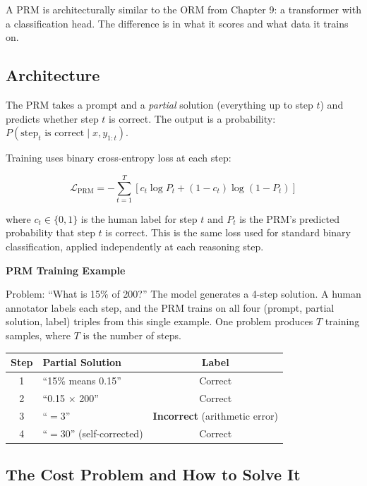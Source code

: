 \begin{chapterenv}
A PRM is architecturally similar to the ORM from Chapter 9: a transformer with a classification head. The difference is in what it scores and what data it trains on.

\subsection{Architecture}

The PRM takes a prompt and a \textit{partial} solution (everything up to step $t$) and predicts whether step $t$ is correct. The output is a probability: $P(\text{step}_t \text{ is correct} \mid x, y_{1:t})$.

Training uses binary cross-entropy loss at each step:

$$\mathcal{L}_{\text{PRM}} = -\sum_{t=1}^{T}\left[c_t \log P_t + (1 - c_t)\log(1 - P_t)\right]$$

where $c_t \in \{0, 1\}$ is the human label for step $t$ and $P_t$ is the PRM's predicted probability that step $t$ is correct. This is the same loss used for standard binary classification, applied independently at each reasoning step.

\begin{infobox}
\textbf{PRM Training Example}

Problem: ``What is 15\% of 200?'' The model generates a 4-step solution. A human annotator labels each step, and the PRM trains on all four (prompt, partial solution, label) triples from this single example. One problem produces $T$ training samples, where $T$ is the number of steps.
\end{infobox}

\begin{center}
\begin{tabular}{clc}
\toprule
\textbf{Step} & \textbf{Partial Solution} & \textbf{Label} \\
\midrule
1 & ``15\% means 0.15'' & Correct \\
2 & ``0.15 $\times$ 200'' & Correct \\
3 & ``$= 3$'' & \textbf{Incorrect} (arithmetic error) \\
4 & ``$= 30$'' (self-corrected) & Correct \\
\bottomrule
\end{tabular}
\end{center}

\subsection{The Cost Problem and How to Solve It}


\end{chapterenv}

